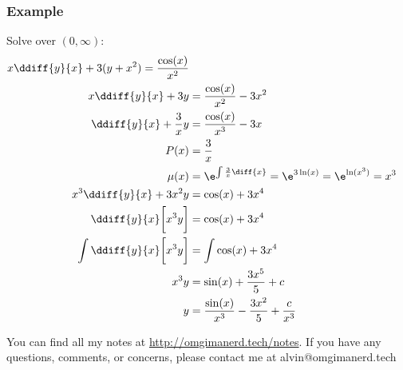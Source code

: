 \documentclass{math}
\begin{document}
\subsubsection*{Example}
Solve over \( (0,\infty) \):
\begin{align*}
  x\ddiff{y}{x}+3(y+x^2) = \frac{\cos(x)}{x^2} \\
  x\ddiff{y}{x}+3y &= \frac{\cos(x)}{x^2}-3x^2 \\
  \ddiff{y}{x}+\frac{3}{x}y &= \frac{\cos(x)}{x^3}-3x \\
  P(x) &= \frac{3}{x} \\
  \mu(x) &= \e^{\int\frac{3}{x}\diff{x}}
    = \e^{3\ln(x)} = \e^{\ln(x^3)} = x^3 \\
  x^3\ddiff{y}{x}+3x^2y &= \cos(x)+3x^4 \\
  \ddiff{y}{x}\bigg[x^3y\bigg] &= \cos(x)+3x^4 \\
  \int\ddiff{y}{x}\bigg[x^3y\bigg] &= \int\cos(x)+3x^4 \\
  x^3y &= \sin(x)+\frac{3x^5}{5}+c \\
  y &= \frac{\sin(x)}{x^3}-\frac{3x^2}{5}+\frac{c}{x^3}
\end{align*}

\begin{center}
  You can find all my notes at \url{http://omgimanerd.tech/notes}. If you have
  any questions, comments, or concerns, please contact me at
  alvin@omgimanerd.tech
\end{center}
\end{document}
